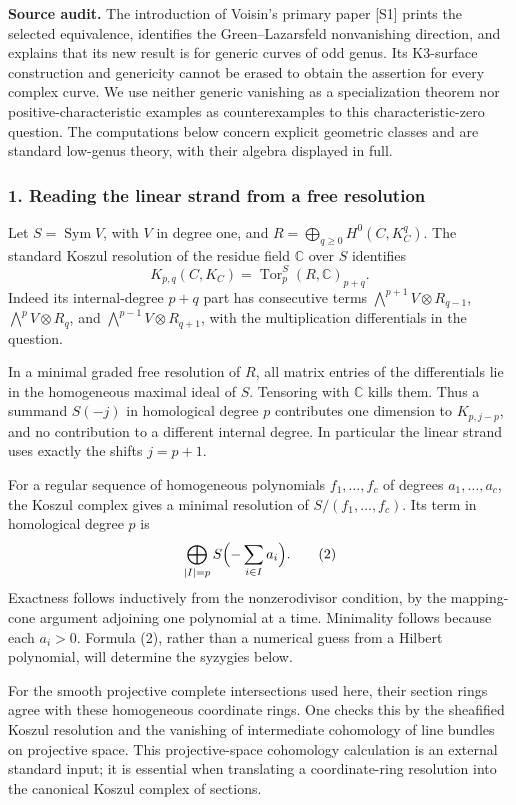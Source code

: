 \documentclass[11pt]{article}
\begin{document}
\textbf{Source audit.} The introduction of Voisin's primary paper [S1] prints the selected equivalence, identifies the Green--Lazarsfeld nonvanishing direction, and explains that its new result is for generic curves of odd genus. Its K3-surface construction and genericity cannot be erased to obtain the assertion for every complex curve. We use neither generic vanishing as a specialization theorem nor positive-characteristic examples as counterexamples to this characteristic-zero question. The computations below concern explicit geometric classes and are standard low-genus theory, with their algebra displayed in full.

\subsubsection{1. Reading the linear strand from a free resolution}
Let $S=\operatorname{Sym}V$, with $V$ in degree one, and
$R=\bigoplus_{q\ge0}H^0(C,K_C^q)$. The standard Koszul resolution of the residue field $\mathbb C$ over $S$ identifies
\[
 K_{p,q}(C,K_C)=\operatorname{Tor}^S_p(R,\mathbb C)_{p+q}.
                                                               \tag{1}
\]
Indeed its internal-degree $p+q$ part has consecutive terms
$\bigwedge^{p+1}V\otimes R_{q-1}$,
$\bigwedge^pV\otimes R_q$, and
$\bigwedge^{p-1}V\otimes R_{q+1}$, with the multiplication differentials in the question.

In a minimal graded free resolution of $R$, all matrix entries of the differentials lie in the homogeneous maximal ideal of $S$. Tensoring with $\mathbb C$ kills them. Thus a summand $S(-j)$ in homological degree $p$ contributes one dimension to $K_{p,j-p}$, and no contribution to a different internal degree. In particular the linear strand uses exactly the shifts $j=p+1$.

For a regular sequence of homogeneous polynomials $f_1,\ldots,f_c$ of degrees $a_1,\ldots,a_c$, the Koszul complex gives a minimal resolution of $S/(f_1,\ldots,f_c)$. Its term in homological degree $p$ is
\[
 \bigoplus_{|I|=p}S\Bigl(-\sum_{i\in I}a_i\Bigr).       \tag{2}
\]
Exactness follows inductively from the nonzerodivisor condition, by the mapping-cone argument adjoining one polynomial at a time. Minimality follows because each $a_i>0$. Formula (2), rather than a numerical guess from a Hilbert polynomial, will determine the syzygies below.

For the smooth projective complete intersections used here, their section rings agree with these homogeneous coordinate rings. One checks this by the sheafified Koszul resolution and the vanishing of intermediate cohomology of line bundles on projective space. This projective-space cohomology calculation is an external standard input; it is essential when translating a coordinate-ring resolution into the canonical Koszul complex of sections.
\end{document}

